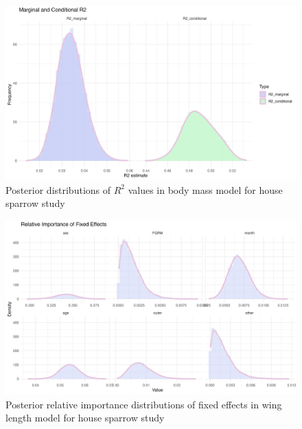 \begin{figure}[H]%
  \centering
  \includegraphics[width=1\linewidth]{Figures/House sparrow study/Mass_r2.png}
  \caption[Posterior distributions of $R^2$ values in body mass model for house sparrow study]{Posterior distributions of $R^2$ values in body mass model for house sparrow study}
  \label{fig:mass_r2}
\end{figure}

\begin{figure}[H]%
  \centering
  \includegraphics[width=1\linewidth]{Figures/House sparrow study/Wing_fixed.png}
  \caption[Posterior relative importance distributions of fixed effects in wing length model for house sparrow study]{Posterior relative importance distributions of fixed effects in wing length model for house sparrow study}
  \label{fig:wing_fixed_sparrows}
\end{figure}

